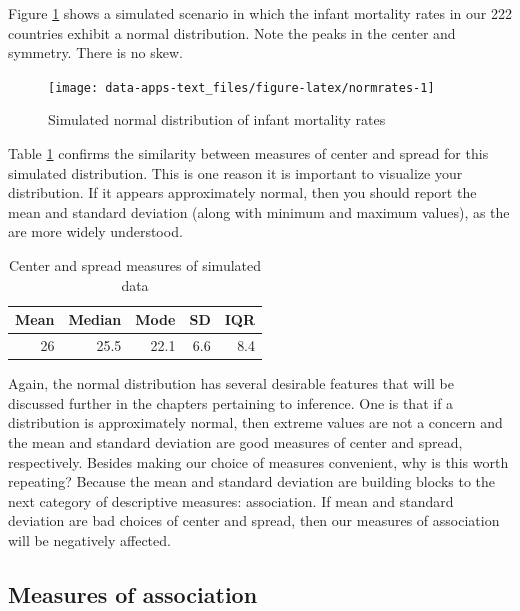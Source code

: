 \documentclass[
]{book}
\begin{document}
Figure \ref{fig:normrates} shows a simulated scenario in which the infant mortality rates in our 222 countries exhibit a normal distribution. Note the peaks in the center and symmetry. There is no skew.

\begin{figure}

{\centering \texttt{[image: data-apps-text\_files/figure-latex/normrates-1]} 

}

\caption{Simulated normal distribution of infant mortality rates}\label{fig:normrates}
\end{figure}

Table \ref{tab:normratesum} confirms the similarity between measures of center and spread for this simulated distribution. This is one reason it is important to visualize your distribution. If it appears approximately normal, then you should report the mean and standard deviation (along with minimum and maximum values), as the are more widely understood.

\begin{table}

\caption{\label{tab:normratesum}Center and spread measures of simulated data}
\centering
\begin{tabular}[t]{r|r|r|r|r}
\hline
Mean & Median & Mode & SD & IQR\\
\hline
26 & 25.5 & 22.1 & 6.6 & 8.4\\
\hline
\end{tabular}
\end{table}

Again, the normal distribution has several desirable features that will be discussed further in the chapters pertaining to inference. One is that if a distribution is approximately normal, then extreme values are not a concern and the mean and standard deviation are good measures of center and spread, respectively. Besides making our choice of measures convenient, why is this worth repeating? Because the mean and standard deviation are building blocks to the next category of descriptive measures: association. If mean and standard deviation are bad choices of center and spread, then our measures of association will be negatively affected.

\hypertarget{measures-of-association}{%
\subsection{Measures of association}\label{measures-of-association}}
\end{document}

